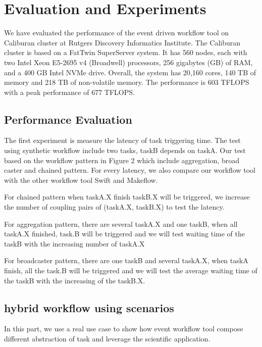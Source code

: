 \section{Evaluation and Experiments}
We have evaluated the performance of the event driven workflow tool on Caliburan cluster at Rutgers Discovery Informatics Institute. The Caliburan cluster is based on a FatTwin SuperServer system. It has 560 nodes, each with two Intel Xeon E5-2695 v4 (Broadwell) processors, 256 gigabytes (GB) of RAM, and a 400 GB Intel NVMe drive. Overall, the system has 20,160 cores, 140 TB of memory and 218 TB of non-volatile memory. The performance is 603 TFLOPS with a peak performance of 677 TFLOPS\cite{caliburn}.

\subsection{Performance Evaluation}
The first experiment is measure the latency of task triggering time. The test using synthetic workflow include two tasks, taskB depends on taskA. Our test based on the workflow pattern in Figure 2 which include aggregation, broad caster and chained pattern. For every latency, we also compare our workflow tool with the other workflow tool Swift\cite{wilde2011swift} and Makeflow\cite{albrecht2012makeflow}.

For chained pattern when taskA.X finish taskB.X will be triggered, we increase the number of coupling pairs of (taskA.X, taskB.X) to test the latency.

For aggregation pattern, there are several taskA.X and one taskB, when all taskA.X finished, task.B will be triggered and we will test waiting time of the taskB with the increasing number of taskA.X

For broadcaster pattern, there are one taskB and several taskA.X, when taskA finish, all the task.B will be triggered and we will test the average waiting time of the taskB with the increasing of the taskB.X.

\subsection{hybrid workflow using scenarios}
In this part, we use a real use case to show how event workflow tool compose different abstraction of task and leverage the scientific application.